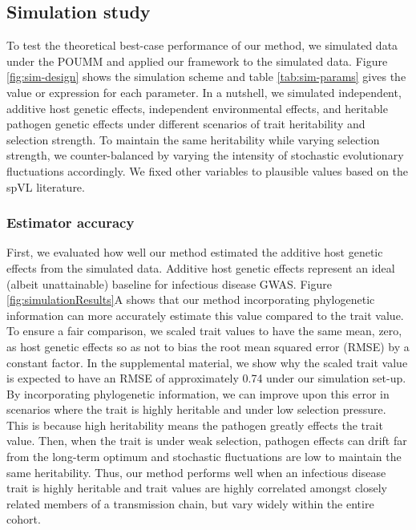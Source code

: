\documentclass[]{article}
\begin{document}
\begin{doublespace}
\subsection{Simulation study}

To test the theoretical best-case performance of our method, we simulated data under the POUMM and applied our framework to the simulated data. Figure \ref{fig:sim-design} shows the simulation scheme and table \ref{tab:sim-params} gives the value or expression for each parameter. In a nutshell, we simulated independent, additive host genetic effects, independent environmental effects, and heritable pathogen genetic effects under different scenarios of trait heritability and selection strength. To maintain the same heritability while varying selection strength, we counter-balanced by varying the intensity of stochastic evolutionary fluctuations accordingly. We fixed other variables to plausible values based on the spVL literature.

\subsubsection{Estimator accuracy}

First, we evaluated how well our method estimated the additive host genetic effects from the simulated data. Additive host genetic effects represent an ideal (albeit unattainable) baseline for infectious disease GWAS. Figure \ref{fig:simulationResults}A shows that our method incorporating phylogenetic information can more accurately estimate this value compared to the trait value. To ensure a fair comparison, we scaled trait values to have the same mean, zero, as host genetic effects so as not to bias the root mean squared error (RMSE) by a constant factor. In the supplemental material, we show why the scaled trait value is expected to have an RMSE of approximately 0.74 under our simulation set-up. By incorporating phylogenetic information, we can improve upon this error in scenarios where the trait is highly heritable and under low selection pressure. This is because high heritability means the pathogen greatly effects the trait value. Then, when the trait is under weak selection, pathogen effects can drift far from the long-term optimum and stochastic fluctuations are low to maintain the same heritability. Thus, our method performs well when an infectious disease trait is highly heritable and trait values are highly correlated amongst closely related members of a transmission chain, but vary widely within the entire cohort.


\end{doublespace}
\end{document}
